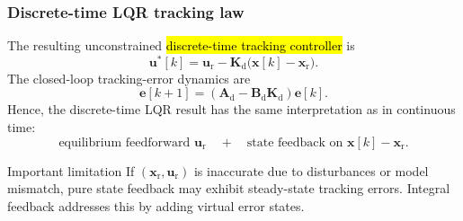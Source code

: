 \begin{frame}
	\frametitle{Discrete-time LQR tracking law}
	The resulting unconstrained \hl{discrete-time tracking controller} is
	\begin{equation}
		\boxed{\bm{u}^*[k]
			=\bm{u}_{\mathrm{r}}-
			\bm{K}_{\mathrm{d}}\bigl(\bm{x}[k]-\bm{x}_{\mathrm{r}}\bigr).}
	\end{equation}\pause%
	The closed-loop tracking-error dynamics are
	\begin{equation}
		\bm{e}[k+1]
		=\left(\bm{A}_{\mathrm{d}}-\bm{B}_{\mathrm{d}}\bm{K}_{\mathrm{d}}\right)\bm{e}[k].
	\end{equation}\pause%
	Hence, the discrete-time LQR result has the same interpretation as in continuous time:
	\begin{equation}
		\text{equilibrium feedforward }\bm{u}_{\mathrm{r}}
		\quad + \quad
		\text{state feedback on }\bm{x}[k]-\bm{x}_{\mathrm{r}}.
	\end{equation}\vspace{-0.4cm}\pause%
	\begin{block}{Important limitation}
		If $(\bm{x}_{\mathrm{r}},\bm{u}_{\mathrm{r}})$ is inaccurate due to disturbances or model mismatch, pure state feedback may exhibit steady-state tracking errors. Integral feedback addresses this by adding virtual error states.
	\end{block}
\end{frame}

